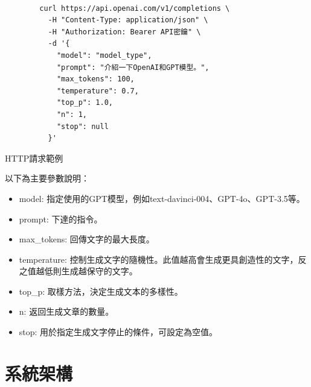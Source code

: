 \documentclass[class=NCU_thesis, crop=false]{standalone}
\begin{document}
\begin{listing}[h]
    \begin{verbatim}

        curl https://api.openai.com/v1/completions \
          -H "Content-Type: application/json" \
          -H "Authorization: Bearer API密鑰" \
          -d '{
            "model": "model_type",
            "prompt": "介紹一下OpenAI和GPT模型。",
            "max_tokens": 100,
            "temperature": 0.7,
            "top_p": 1.0,
            "n": 1,
            "stop": null
          }'
    \end{verbatim}
\caption{HTTP請求範例} 
\end{listing}
\clearpage
以下為主要參數說明：
\begin{itemize}
    \item model: 指定使用的GPT模型，例如text-davinci-004、GPT-4o、GPT-3.5等。
    \item prompt: 下達的指令。
    \item max\_tokens: 回傳文字的最大長度。
    \item temperature: 控制生成文字的隨機性。此值越高會生成更具創造性的文字，反之值越低則生成越保守的文字。
    \item top\_p: 取樣方法，決定生成文本的多樣性。
    \item n: 返回生成文章的數量。
    \item stop: 用於指定生成文字停止的條件，可設定為空值。
\end{itemize}
\newpage

\section{系統架構}
\end{document}
